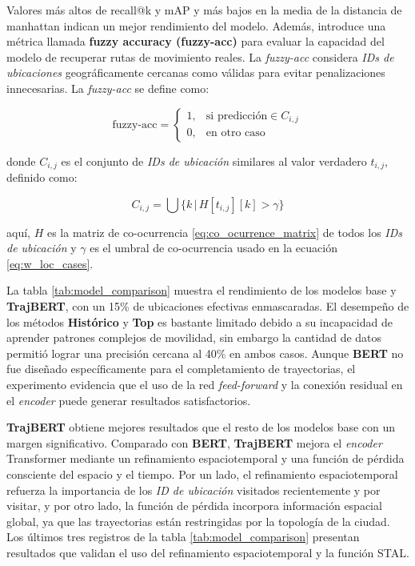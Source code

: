 Valores más altos de recall@k y mAP y más bajos en la media de la distancia de manhattan indican un mejor rendimiento del modelo. Además, \cite{si2023trajbert} introduce una métrica llamada \textbf{fuzzy accuracy (fuzzy-acc)} para evaluar la capacidad del modelo de recuperar rutas de movimiento reales. La \textit{fuzzy-acc} considera \textit{IDs de ubicaciones} geográficamente cercanas como válidas para evitar penalizaciones innecesarias. La \textit{fuzzy-acc} se define como:

\begin{equation}
    \text{fuzzy-acc} = 
    \begin{cases} 
    1, & \text{si } \text{predicción} \in C_{i,j} \\
    0, & \text{en otro caso}
    \end{cases}
\end{equation}
 
\noindent
donde $C_{i,j}$ es el conjunto de \textit{IDs de ubicación} similares al valor verdadero $t_{i,j}$, definido como:

\begin{equation}
    C_{i,j} = \bigcup \{k \,|\, H[t_{i,j}][k] > \gamma\}
\end{equation}

\noindent
aquí, $H$ es la matriz de co-ocurrencia \ref{eq:co_ocurrence_matrix} de todos los \textit{IDs de ubicación} y $\gamma$ es el umbral de co-ocurrencia usado en la ecuación \ref{eq:w_loc_cases}. 

La tabla \ref{tab:model_comparison} muestra el rendimiento de los modelos base y \textbf{TrajBERT}, con un 15\% de ubicaciones efectivas enmascaradas. El desempeño de los métodos \textbf{Histórico} y \textbf{Top} es bastante limitado debido a su incapacidad de aprender patrones complejos de movilidad, sin embargo la cantidad de datos permitió lograr una precisión cercana al 40\% en ambos casos. Aunque \textbf{BERT} no fue diseñado específicamente para el completamiento de trayectorias, el experimento evidencia que el uso de la red \textit{feed-forward} y la conexión residual en el \textit{encoder} puede generar resultados satisfactorios.

\textbf{TrajBERT} obtiene mejores resultados que el resto de los modelos base con un margen significativo. Comparado con \textbf{BERT}, \textbf{TrajBERT} mejora el \textit{encoder} Transformer mediante un refinamiento espaciotemporal y una función de pérdida consciente del espacio y el tiempo. Por un lado, el refinamiento espaciotemporal refuerza la importancia de los \textit{ID de ubicación} visitados recientemente y por visitar, y por otro lado, la función de pérdida incorpora información espacial global, ya que las trayectorias están restringidas por la topología de la ciudad. Los últimos tres registros de la tabla \ref{tab:model_comparison} presentan resultados que validan el uso del refinamiento espaciotemporal y la función STAL.

